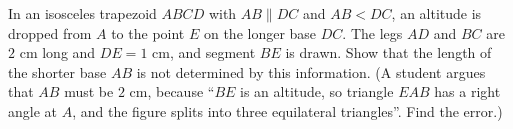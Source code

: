 In an isosceles trapezoid $ABCD$ with $AB\parallel DC$ and $AB<DC$, an altitude is dropped from $A$ to the point $E$ on the longer base $DC$. The legs $AD$ and $BC$ are $2$ cm long and $DE=1$ cm, and segment $BE$ is drawn. Show that the length of the shorter base $AB$ is not determined by this information. (A student argues that $AB$ must be $2$ cm, because ``$BE$ is an altitude, so triangle $EAB$ has a right angle at $A$, and the figure splits into three equilateral triangles''. Find the error.)
